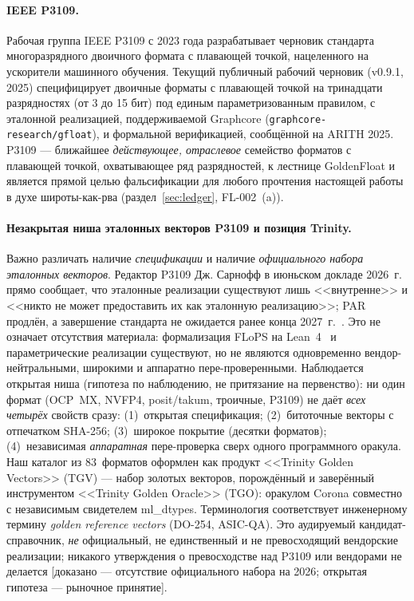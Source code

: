 \documentclass[11pt,a4paper]{article}
\theoremstyle{plain}
\begin{document}
\paragraph{IEEE P3109.}
Рабочая группа IEEE P3109 с 2023 года разрабатывает черновик стандарта
многоразрядного двоичного формата с плавающей точкой, нацеленного на ускорители
машинного обучения. Текущий публичный рабочий черновик (v0.9.1, 2025)
специфицирует двоичные форматы с плавающей точкой на тринадцати разрядностях (от
3 до 15 бит) под единым параметризованным правилом, с эталонной реализацией,
поддерживаемой Graphcore (\texttt{graphcore-research/gfloat}), и формальной
верификацией, сообщённой на ARITH 2025. P3109 --- ближайшее
\emph{действующее, отраслевое} семейство форматов с плавающей точкой,
охватывающее ряд разрядностей, к лестнице GoldenFloat и является прямой целью
фальсификации для любого прочтения настоящей работы в духе широты-как-рва
(раздел~\ref{sec:ledger}, FL-002~(a)).

\paragraph{Незакрытая ниша эталонных векторов P3109 и позиция Trinity.}
Важно различать наличие \emph{спецификации} и наличие \emph{официального
набора эталонных векторов}. Редактор P3109 Дж. Сарнофф в июньском докладе
2026~г.~\cite{sarnoff2026} прямо сообщает, что эталонные реализации существуют
лишь <<внутренне>> и <<никто не может предоставить их как эталонную
реализацию>>; PAR продлён, а завершение стандарта не ожидается ранее конца
2027~г.~\cite{nescom2025}. Это не означает отсутствия материала: формализация
FLoPS на Lean~4~\cite{flops2026} и параметрические реализации существуют, но не
являются одновременно вендор-нейтральными, широкими и аппаратно
пере-проверенными. Наблюдается открытая ниша (гипотеза по наблюдению, не
притязание на первенство): ни один формат (OCP~MX, NVFP4, posit/takum, троичные,
P3109) не даёт \emph{всех четырёх} свойств сразу: (1)~открытая спецификация;
(2)~битоточные векторы с отпечатком SHA-256; (3)~широкое покрытие (десятки
форматов); (4)~независимая \emph{аппаратная} пере-проверка сверх одного
программного оракула. Наш каталог из 83~форматов оформлен как продукт
<<Trinity Golden Vectors>> (TGV) --- набор золотых векторов, порождённый и
заверённый инструментом <<Trinity Golden Oracle>> (TGO): оракулом Corona
совместно с независимым свидетелем ml\_dtypes. Терминология соответствует
инженерному термину \emph{golden reference vectors} (DO-254, ASIC-QA). Это
аудируемый кандидат-справочник, \emph{не} официальный, не единственный и не
превосходящий вендорские реализации; никакого утверждения о превосходстве над
P3109 или вендорами не делается [доказано --- отсутствие официального набора на
2026; открытая гипотеза --- рыночное принятие].
\end{document}
